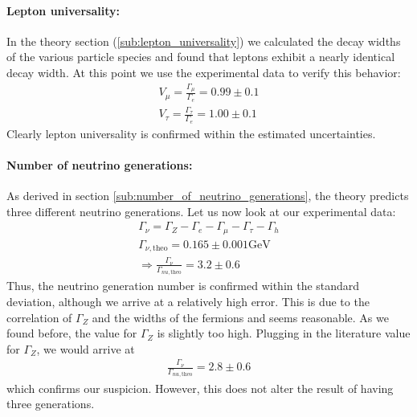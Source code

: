 \paragraph{\textbf{Lepton universality:}} 
\label{par:lepton_universality} In the theory section (\ref{sub:lepton_universality}) we calculated the decay widths of the various
particle species and found that leptons exhibit a nearly identical
decay width. At this point we use the experimental data to verify this behavior: 
\label{ssub:leptonun}
\begin{align}
    V_\mu = \frac{\Gamma_\mu}{\Gamma_e} = 0.99 \pm 0.1 \\ 
    V_\tau = \frac{\Gamma_\tau}{\Gamma_e} = 1.00 \pm 0.1 
\end{align}
Clearly lepton universality is confirmed within the estimated uncertainties.

\paragraph{\textbf{Number of neutrino generations:}}
\label{par:number_of_neutrino_generations}
As derived in section \ref{sub:number_of_neutrino_generations}, the theory predicts three different neutrino generations.
Let us now look at our experimental data:
\begin{align}
    \label{eq:gen}
    \Gamma_\nu = \Gamma_Z - \Gamma_e - \Gamma_\mu - \Gamma_\tau - \Gamma_h \\ 
    \Gamma_{\nu, \mathrm{theo}} = 0.165 \pm 0.001 \mathrm{GeV} \\ 
    \Rightarrow \frac{\Gamma_\nu}{\Gamma_{nu, \mathrm{theo}}}  = 3.2 \pm 0.6
\end{align}
Thus, the neutrino generation number is confirmed within the standard deviation, 
although we arrive at a relatively high error. This is due to the
correlation of $\Gamma_Z$ and the widths of the fermions and seems reasonable. As we found before, the value for
$\Gamma_Z$ is slightly too high. Plugging in the literature value for $\Gamma_Z$, we would arrive at
\begin{align}
   \frac{\Gamma_\nu}{\Gamma_{nu, \mathrm{theo}}}  = 2.8 \pm 0.6
\end{align}
which confirms our suspicion. However, this does not alter the result of having three generations.

